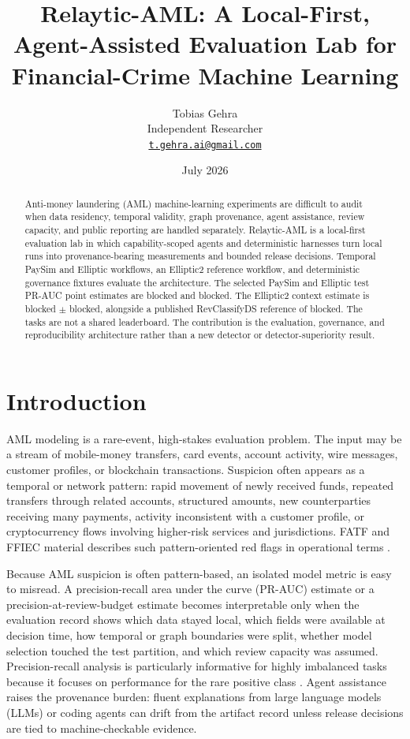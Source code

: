 \documentclass[11pt]{article}
\title{Relaytic-AML: A Local-First, Agent-Assisted Evaluation Lab for Financial-Crime Machine Learning}
\author{Tobias Gehra\\Independent Researcher\\\href{mailto:t.gehra.ai@gmail.com}{\texttt{t.gehra.ai@gmail.com}}}
\date{July 2026}
\begin{document}
\maketitle


\begin{abstract}

Anti-money laundering (AML) machine-learning experiments are difficult to audit when data residency, temporal validity, graph provenance, agent assistance, review capacity, and public reporting are handled separately. Relaytic-AML is a local-first evaluation lab in which capability-scoped agents and deterministic harnesses turn local runs into provenance-bearing measurements and bounded release decisions. Temporal PaySim and Elliptic workflows, an Elliptic2 reference workflow, and deterministic governance fixtures evaluate the architecture. The selected PaySim and Elliptic test PR-AUC point estimates are blocked and blocked. The Elliptic2 context estimate is blocked \ensuremath{\pm} blocked, alongside a published RevClassifyDS reference of blocked. The tasks are not a shared leaderboard. The contribution is the evaluation, governance, and reproducibility architecture rather than a new detector or detector-superiority result.

\end{abstract}

\section{Introduction}

AML modeling is a rare-event, high-stakes evaluation problem. The input may be a stream of mobile-money transfers, card events, account activity, wire messages, customer profiles, or blockchain transactions. Suspicion often appears as a temporal or network pattern: rapid movement of newly received funds, repeated transfers through related accounts, structured amounts, new counterparties receiving many payments, activity inconsistent with a customer profile, or cryptocurrency flows involving higher-risk services and jurisdictions. FATF and FFIEC material describes such pattern-oriented red flags in operational terms \citep{fatf2020virtualassets,ffiecRedFlags}.

Because AML suspicion is often pattern-based, an isolated model metric is easy to misread. A precision-recall area under the curve (PR-AUC) estimate or a precision-at-review-budget estimate becomes interpretable only when the evaluation record shows which data stayed local, which fields were available at decision time, how temporal or graph boundaries were split, whether model selection touched the test partition, and which review capacity was assumed. Precision-recall analysis is particularly informative for highly imbalanced tasks because it focuses on performance for the rare positive class \citep{saito2015precisionrecall}. Agent assistance raises the provenance burden: fluent explanations from large language models (LLMs) or coding agents can drift from the artifact record unless release decisions are tied to machine-checkable evidence.
\end{document}
